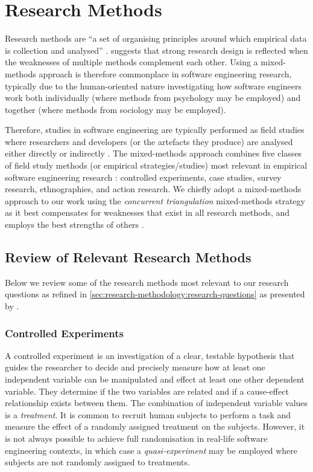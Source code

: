 \section{Research Methods}
\label{sec:research-methodology:review}

Research methods are ``a set of organising principles around which empirical data is collection and analysed'' \citep{Easterbrook:2007ws}. \citet{Creswell:2017vn} suggests that strong research design is reflected when the weaknesses of multiple methods complement each other. Using a mixed-methods approach is therefore commonplace in software engineering research, typically due to the human-oriented nature investigating how software engineers work both individually (where methods from psychology may be employed) and together (where methods from sociology may be employed).

Therefore, studies in software engineering are typically performed as field studies where researchers and developers (or the artefacts they produce) are analysed either directly or indirectly \citep{Singer:2007tu}. The mixed-methods approach combines five classes of field study methods (or empirical strategies/studies) most relevant in empirical software engineering research \citep{Easterbrook:2007ws, Wohlin:2012bu, Juristo:2013vj}: controlled experiments, case studies, survey research, ethnographies, and action research. We chiefly adopt a mixed-methods approach to our work using the \textit{concurrent triangulation} mixed-methods strategy \citep{Jick:1979el} as it best compensates for weaknesses that exist in all research methods, and employs the best strengths of others \citep{Creswell:2017vn}.

\subsection{Review of Relevant Research Methods}
\label{ssec:research-methodology:review:methods}

Below we review some of the research methods most relevant to our research questions as refined in \cref{sec:research-methodology:research-questions} as presented by \citet{Easterbrook:2007ws}.

\subsubsection{Controlled Experiments}
A controlled experiment is an investigation of a clear, testable hypothesis that guides the researcher to decide and precisely measure how at least one independent variable can be manipulated and effect at least one other dependent variable. They determine if the two variables are related and if a cause-effect relationship exists between them. The combination of independent variable values is a \textit{treatment}. It is common to recruit human subjects to perform a task and measure the effect of a randomly assigned treatment on the subjects. However, it is not always possible to achieve full randomisation in real-life software engineering contexts, in which case a \textit{quasi-experiment} may be employed where subjects are not randomly assigned to treatments.

